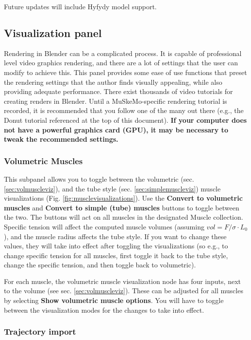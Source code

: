 \documentclass{article}
\begin{document}
Future updates will include Hyfydy model support.


\subsection{Visualization panel}
\label{sec:visualizationpanel}
Rendering in Blender can be a complicated process. It is capable of professional level video graphics rendering, and there are a lot of settings that the user can modify to achieve this. This panel provides some ease of use functions that preset the rendering settings that the author finds visually appealing, while also providing adequate performance. There exist thousands of video tutorials for creating renders in Blender. Until a MuSkeMo-specific rendering tutorial is recorded, it is recommended that you follow one of the many out there (e.g., the Donut tutorial referenced at the top of this document). \textbf{If your computer does not have a powerful graphics card (GPU), it may be necessary to tweak the recommended settings.} 

\subsubsection{Volumetric Muscles}
\label{sec:visualizationpanelvolmusc}
This subpanel allows you to toggle between the volumetric (sec. \ref{sec:volmuscleviz}), and the tube style (sec. \ref{sec:simplemuscleviz}) muscle visualizations (Fig. \ref{fig:musclevisualizations}). Use the \textbf{Convert to volumetric muscles} and \textbf{Convert to simple (tube) muscles} buttons to toggle between the two. The buttons will act on all muscles in the designated Muscle collection. Specific tension will affect the computed muscle volumes (assuming $vol = F/\sigma \cdot L_{0}$), and the muscle radius affects the tube style. If you want to change these values, they will take into effect after toggling the visualizations (so e.g., to change specific tension for all muscles, first toggle it back to the tube style, change the specific tension, and then toggle back to volumetric).

For each muscle, the volumetric muscle visualization node has four inputs, next to the volume (see sec. \ref{sec:volmuscleviz}). These can be adjusted for all muscles by selecting \textbf{Show volumetric muscle options}. You will have to toggle between the visualization modes for the changes to take into effect.

\subsubsection{Trajectory import}
\label{sec:trajectoryimport}
\end{document}

